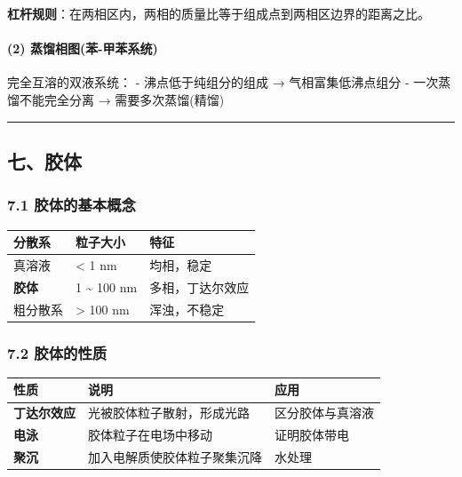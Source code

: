 \textbf{杠杆规则}：在两相区内，两相的质量比等于组成点到两相区边界的距离之比。

\paragraph{(2) 蒸馏相图(苯-甲苯系统)}\label{ux84b8ux998fux76f8ux56feux82ef-ux7532ux82efux7cfbux7edf}

完全互溶的双液系统：
- 沸点低于纯组分的组成 → 气相富集低沸点组分
- 一次蒸馏不能完全分离 → 需要多次蒸馏(精馏)

\begin{center}\rule{0.5\linewidth}{0.5pt}\end{center}

\subsection{七、胶体}\label{ux4e03ux80f6ux4f53}

\subsubsection{7.1 胶体的基本概念}\label{ux80f6ux4f53ux7684ux57faux672cux6982ux5ff5}

{\def\LTcaptype{none} %
\begin{longtable}[]{@{}lll@{}}
\toprule\noalign{}
分散系 & 粒子大小 & 特征 \\
\midrule\noalign{}
\endhead
\bottomrule\noalign{}
\endlastfoot
真溶液 & \textless{} 1 nm & 均相，稳定 \\
\textbf{胶体} & 1 \textasciitilde{} 100 nm & 多相，丁达尔效应 \\
粗分散系 & \textgreater{} 100 nm & 浑浊，不稳定 \\
\end{longtable}
}

\subsubsection{7.2 胶体的性质}\label{ux80f6ux4f53ux7684ux6027ux8d28}

{\def\LTcaptype{none} %
\begin{longtable}[]{@{}lll@{}}
\toprule\noalign{}
性质 & 说明 & 应用 \\
\midrule\noalign{}
\endhead
\bottomrule\noalign{}
\endlastfoot
\textbf{丁达尔效应} & 光被胶体粒子散射，形成光路 & 区分胶体与真溶液 \\
\textbf{电泳} & 胶体粒子在电场中移动 & 证明胶体带电 \\
\textbf{聚沉} & 加入电解质使胶体粒子聚集沉降 & 水处理 \\
\end{longtable}
}

